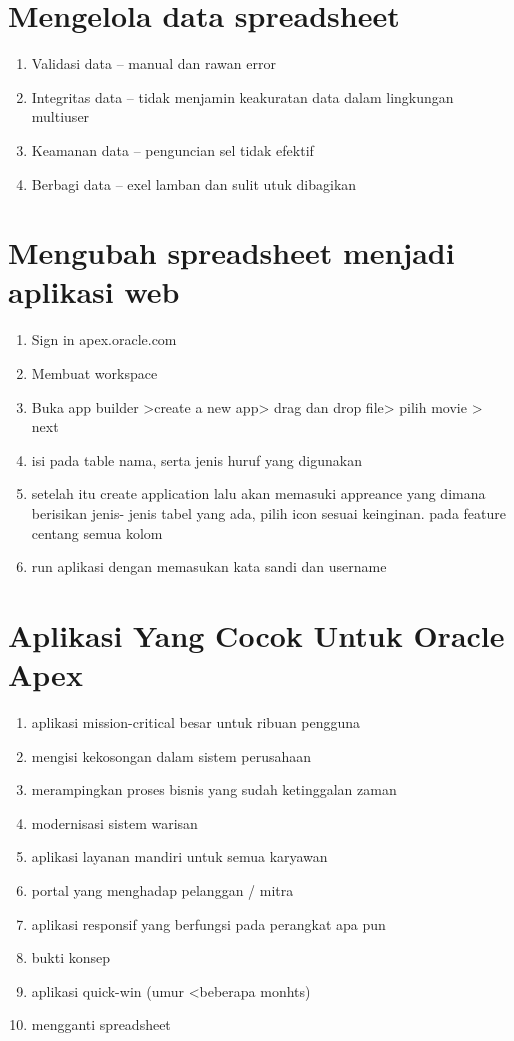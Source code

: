 \section{Mengelola data spreadsheet}
  \begin{enumerate}
      \item Validasi data    -- manual dan rawan error
      \item Integritas data  -- tidak menjamin keakuratan data dalam lingkungan multiuser
      \item Keamanan data    -- penguncian sel tidak efektif
      \item Berbagi data     -- exel lamban dan sulit utuk dibagikan
  \end{enumerate}  
  
\section{Mengubah spreadsheet menjadi aplikasi web}
  \begin{enumerate}
      \item Sign in apex.oracle.com
      \item Membuat workspace
      \item Buka app builder >create a new app>  drag dan drop file> pilih movie > next
      \item isi pada table nama, serta jenis huruf yang digunakan
      \item setelah itu create application lalu akan memasuki appreance yang dimana berisikan jenis- jenis tabel yang ada, pilih icon sesuai keinginan. pada feature centang semua kolom
      \item run aplikasi dengan memasukan kata sandi dan username
\end{enumerate}


\section{Aplikasi Yang Cocok Untuk Oracle Apex}
\begin{enumerate}
\item aplikasi mission-critical besar untuk ribuan pengguna
\item mengisi kekosongan dalam sistem perusahaan
\item merampingkan proses bisnis yang sudah ketinggalan zaman
\item modernisasi sistem warisan
\item aplikasi layanan mandiri untuk semua karyawan
\item portal yang menghadap pelanggan / mitra
\item aplikasi responsif yang berfungsi pada perangkat apa pun
\item bukti konsep
\item aplikasi quick-win (umur <beberapa monhts)
\item mengganti spreadsheet
\end{enumerate}


